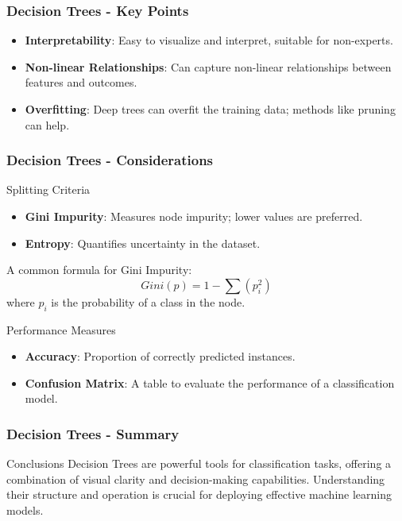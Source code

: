 \documentclass[aspectratio=169]{beamer}
\begin{document}
\begin{frame}[fragile]
    \frametitle{Decision Trees - Key Points}
    \begin{itemize}
        \item \textbf{Interpretability}: Easy to visualize and interpret, suitable for non-experts.
        \item \textbf{Non-linear Relationships}: Can capture non-linear relationships between features and outcomes.
        \item \textbf{Overfitting}: Deep trees can overfit the training data; methods like pruning can help.
    \end{itemize}
\end{frame}

\begin{frame}[fragile]
    \frametitle{Decision Trees - Considerations}
    \begin{block}{Splitting Criteria}
        \begin{itemize}
            \item \textbf{Gini Impurity}: Measures node impurity; lower values are preferred.
            \item \textbf{Entropy}: Quantifies uncertainty in the dataset. 
        \end{itemize}
        A common formula for Gini Impurity:
        \begin{equation}
            Gini(p) = 1 - \sum (p_i^2)
        \end{equation}
        where \( p_i \) is the probability of a class in the node.
    \end{block}

    \begin{block}{Performance Measures}
        \begin{itemize}
            \item \textbf{Accuracy}: Proportion of correctly predicted instances.
            \item \textbf{Confusion Matrix}: A table to evaluate the performance of a classification model.
        \end{itemize}
    \end{block}
\end{frame}

\begin{frame}[fragile]
    \frametitle{Decision Trees - Summary}
    \begin{block}{Conclusions}
        Decision Trees are powerful tools for classification tasks, offering a combination of visual clarity and decision-making capabilities. Understanding their structure and operation is crucial for deploying effective machine learning models.
    \end{block}
\end{frame}
\end{document}
